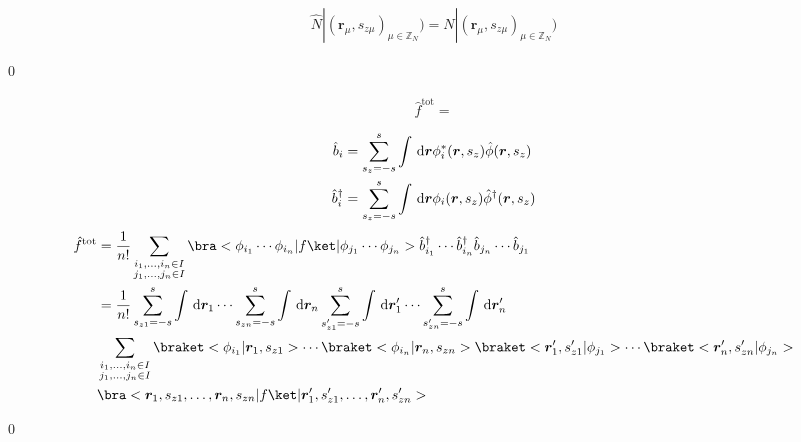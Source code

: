\documentclass[uplatex,dvipdfmx,a4paper,11pt]{jlreq}
\makeatletter
\newcommand{\ZZ}{\mathbb{Z}}
\newcommand{\rr}{\bm{r}}
\numberwithin{equation}{section}
\theoremstyle{definition}
\renewenvironment{proof}[1][\proofname]{\par
  \normalfont
  \topsep6\p@\@plus6\p@ \trivlist
  \item[\hskip\labelsep{\bfseries #1}\@addpunct{\bfseries}]\ignorespaces\quad\par
}{
  \qed\endtrivlist\@endpefalse
}
\renewcommand\proofname{証明}
\makeatother
\begin{document}
\begin{theorem}
  \begin{align}
    \hat{N}|(\rr_\mu, s_{z\mu})_{\mu\in\ZZ_N}) = N|(\rr_\mu, s_{z\mu})_{\mu\in\ZZ_N})
  \end{align}
\end{theorem}
\begin{proof}
\end{proof}

\begin{theorem}
  \begin{align}
    \hat{f}^{\mathrm{tot}} =
  \end{align}
\end{theorem}
\begin{proof}
  \begin{align}
    \hat{b}_i         & = \sum_{s_z = -s}^s\int\dl{\rr}\phi_i^*(\rr, s_z)\hat{\phi}(\rr, s_z)       \\
    \hat{b}_i^\dagger & = \sum_{s_z = -s}^s\int\dl{\rr}\phi_i(\rr, s_z)\hat{\phi}^\dagger(\rr, s_z)
  \end{align}
  \begin{align}
    \hat{f}^{\mathrm{tot}} & = \frac{1}{n!}\sum_{\substack{i_1,\ldots,i_n\in I                                                                                                                                                                     \\ j_1,\ldots,j_n\in I}}\bra<\phi_{i_1}\cdots\phi_{i_n}|f\ket|\phi_{j_1}\cdots\phi_{j_n}>\hat{b}_{i_1}^\dagger\cdots\hat{b}_{i_n}^\dagger\hat{b}_{j_n}\cdots\hat{b}_{j_1} \\
                           & = \frac{1}{n!}\sum_{s_{z1} = -s}^s\int\dl{\rr_1}\cdots\sum_{s_{zn} = -s}^s\int\dl{\rr_n}\sum_{s_{z1}' = -s}^s\int\dl{\rr_1'}\cdots\sum_{s_{zn}' = -s}^s\int\dl{\rr_n'}                                                \\
                           & \sum_{\substack{i_1,\ldots,i_n\in I                                                                                                                                                                                   \\ j_1,\ldots,j_n\in I}}
    \braket<\phi_{i_1}|\rr_1,s_{z1}>\cdots\braket<\phi_{i_n}|\rr_n,s_{zn}>\braket<\rr_1',s_{z1}'|\phi_{j_1}>\cdots\braket<\rr_n',s_{zn}'|\phi_{j_n}>                                                                                               \\
                           & \bra<\rr_1,s_{z1},\ldots,\rr_n,s_{zn}|f\ket|\rr_1',s_{z1}',\ldots,\rr_n',s_{zn}'>                                                                                                                                     \\

\end{align}
\end{proof}
\end{document}
